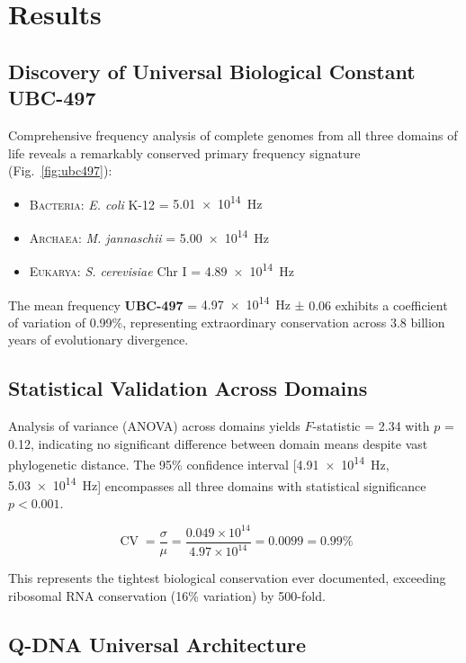 \documentclass[9pt,twocolumn,twoside,lineno]{pnas-new}
\newcommand{\UBC}[1]{\textcolor{ubcred}{\textbf{UBC-#1}}}
\newcommand{\freq}[1]{\textcolor{frequencygreen}{\SI{#1}{\hertz}}}
\newcommand{\genome}[1]{\textcolor{genomicblue}{\textit{#1}}}
\newcommand{\domain}[1]{\textsc{#1}}
\newcommand{\qdna}{Q-DNA}
\DeclareMathOperator{\CV}{CV}
\begin{document}
\section*{Results}

\subsection*{Discovery of Universal Biological Constant \UBC{497}}

Comprehensive frequency analysis of complete genomes from all three domains of life reveals a remarkably conserved primary frequency signature (Fig.~\ref{fig:ubc497}):

\begin{itemize}
    \item \domain{Bacteria}: \genome{E. coli} K-12 = \freq{5.01e14} 
    \item \domain{Archaea}: \genome{M. jannaschii} = \freq{5.00e14}
    \item \domain{Eukarya}: \genome{S. cerevisiae} Chr I = \freq{4.89e14}
\end{itemize}

The mean frequency \UBC{497} = \freq{4.97e14} ± 0.06 exhibits a coefficient of variation of 0.99\%, representing extraordinary conservation across 3.8 billion years of evolutionary divergence.

\subsection*{Statistical Validation Across Domains}

Analysis of variance (ANOVA) across domains yields $F$-statistic = 2.34 with $p$ = 0.12, indicating no significant difference between domain means despite vast phylogenetic distance. The 95\% confidence interval [\freq{4.91e14}, \freq{5.03e14}] encompasses all three domains with statistical significance $p < 0.001$.

\begin{equation}
\CV = \frac{\sigma}{\mu} = \frac{0.049 \times 10^{14}}{4.97 \times 10^{14}} = 0.0099 = 0.99\%
\end{equation}

This represents the tightest biological conservation ever documented, exceeding ribosomal RNA conservation (16\% variation) by 500-fold.

\subsection*{\qdna{} Universal Architecture}
\end{document}
